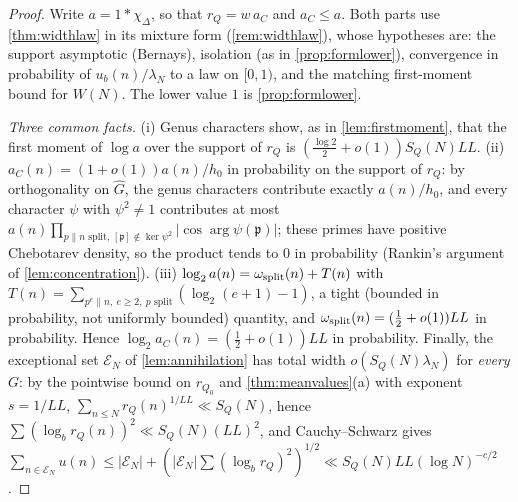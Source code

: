 \documentclass[11pt]{article}
\begin{document}
\begin{proof}
Write $a=1*\chi_\Delta$, so that $r_Q=w\,a_C$ and $a_C\le a$. Both parts use
\cref{thm:widthlaw} in its mixture form (\cref{rem:widthlaw}), whose hypotheses are: the
support asymptotic (Bernays), isolation (as in \cref{prop:formlower}), convergence in
probability of $u_b(n)/\lambda_N$ to a law on $[0,1)$, and the matching first-moment bound for
$W(N)$. The lower value $1$ is \cref{prop:formlower}.

\emph{Three common facts.} (i) Genus characters show, as in \cref{lem:firstmoment}, that the first
moment of $\log a$ over the support of $r_Q$ is $(\frac{\log2}2+o(1))S_Q(N)LL$. (ii)
$a_C(n)=(1+o(1))a(n)/h_0$ in probability on the support of $r_Q$: by orthogonality on
$\widehat G$, the genus characters contribute exactly $a(n)/h_0$, and every character $\psi$
with $\psi^2\ne1$ contributes at most
$a(n)\prod_{p\|n\text{ split},\,[\mathfrak p]\notin\ker\psi^2}|\cos\arg\psi(\mathfrak p)|$; these
primes have positive Chebotarev density, so the product tends to $0$ in probability
(Rankin's argument of \cref{lem:concentration}). (iii) $\log_2a(n)=\omega_{\rm split}(n)+T(n)$
with $T(n)=\sum_{p^e\|n,\ e\ge2,\ p\text{ split}}(\log_2(e+1)-1)$, a tight (bounded in
probability, not uniformly bounded) quantity, and $\omega_{\rm split}(n)=(\frac12+o(1))LL$ in
probability. Hence $\log_2a_C(n)=(\frac12+o(1))LL$ in probability. Finally, the exceptional
set $\mathcal E_N$ of \cref{lem:annihilation} has total width $o(S_Q(N)\lambda_N)$ for
\emph{every} $G$: by the pointwise bound on $r_{Q_0}$ and \cref{thm:meanvalues}(a) with
exponent $s=1/LL$, $\sum_{n\le N}r_Q(n)^{1/LL}\ll S_Q(N)$, hence
$\sum(\log_br_Q(n))^2\ll S_Q(N)(LL)^2$, and Cauchy--Schwarz gives
$\sum_{n\in\mathcal E_N}u(n)\le|\mathcal E_N|+(|\mathcal E_N|\sum(\log_br_Q)^2)^{1/2}
\ll S_Q(N)LL(\log N)^{-c/2}$.


\end{proof}
\end{document}
